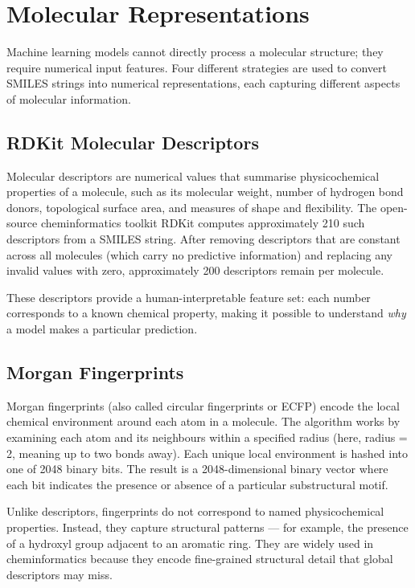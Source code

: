 \documentclass[11pt,a4paper]{article}
\begin{document}
\section{Molecular Representations}

Machine learning models cannot directly process a molecular structure; they require numerical input features. Four different strategies are used to convert SMILES strings into numerical representations, each capturing different aspects of molecular information.

\subsection{RDKit Molecular Descriptors}

Molecular descriptors are numerical values that summarise physicochemical properties of a molecule, such as its molecular weight, number of hydrogen bond donors, topological surface area, and measures of shape and flexibility. The open-source cheminformatics toolkit RDKit computes approximately 210 such descriptors from a SMILES string. After removing descriptors that are constant across all molecules (which carry no predictive information) and replacing any invalid values with zero, approximately 200 descriptors remain per molecule.

These descriptors provide a human-interpretable feature set: each number corresponds to a known chemical property, making it possible to understand \emph{why} a model makes a particular prediction.

\subsection{Morgan Fingerprints}

Morgan fingerprints (also called circular fingerprints or ECFP) encode the local chemical environment around each atom in a molecule. The algorithm works by examining each atom and its neighbours within a specified radius (here, radius = 2, meaning up to two bonds away). Each unique local environment is hashed into one of 2048 binary bits. The result is a 2048-dimensional binary vector where each bit indicates the presence or absence of a particular substructural motif.

Unlike descriptors, fingerprints do not correspond to named physicochemical properties. Instead, they capture structural patterns --- for example, the presence of a hydroxyl group adjacent to an aromatic ring. They are widely used in cheminformatics because they encode fine-grained structural detail that global descriptors may miss.
\end{document}
